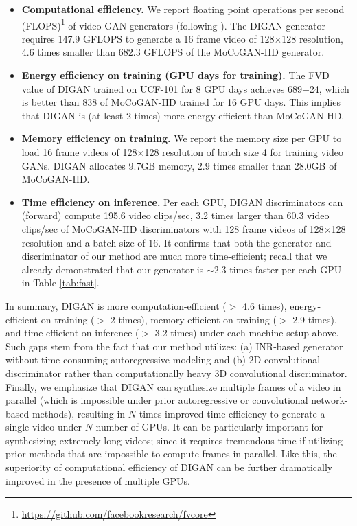 \documentclass{article} \usepackage{iclr2022_conference,times}
\begin{document}
\begin{itemize}[leftmargin=0.2in]
    \item \textbf{Computational efficiency.} 
    We report floating point operations per second (FLOPS)\footnote{\url{ https://github.com/facebookresearch/fvcore}} of video GAN generators (following \citet{liu2021content}). The DIGAN generator requires 147.9 GFLOPS to generate a 16 frame video of 128$\times$128 resolution, 4.6 times smaller than 682.3 GFLOPS of the MoCoGAN-HD generator. 

    \item \textbf{Energy efficiency on training (GPU days for training).} The FVD value of DIGAN trained on UCF-101 for 8 GPU days achieves 689$\pm$24, which is better than 838 of MoCoGAN-HD trained for 16 GPU days. This implies that DIGAN is (at least 2 times) more energy-efficient than MoCoGAN-HD.

    \item \textbf{Memory efficiency on training.} We report the memory size per GPU to load 16 frame videos of 128$\times$128 resolution of batch size 4 for training video GANs. DIGAN allocates 9.7GB memory, 2.9 times smaller than 28.0GB of MoCoGAN-HD.	


    \item \textbf{Time efficiency on inference.} Per each GPU, DIGAN discriminators can (forward) compute 195.6 video clips/sec, 3.2 times larger than 60.3 video clips/sec of MoCoGAN-HD discriminators with 128 frame videos of 128$\times$128 resolution and a batch size of 16. It confirms that both the generator and discriminator of our method are much more time-efficient; recall that we already demonstrated that our generator is $\sim$2.3 times faster per each GPU in Table \ref{tab:fast}.
\end{itemize}
In summary, DIGAN is more computation-efficient ($>$ 4.6 times), energy-efficient on training  ($>$ 2 times), memory-efficient on training ($>$ 2.9 times), and time-efficient on inference ($>$ 3.2 times) under each machine setup above. Such gaps stem from the fact that our method utilizes: (a) INR-based generator without time-consuming autoregressive modeling and (b) 2D convolutional discriminator rather than computationally heavy 3D convolutional discriminator. Finally, we emphasize that DIGAN can synthesize multiple frames of a video in parallel (which is impossible under prior autoregressive or convolutional network-based methods), resulting in $N$ times improved time-efficiency to generate a single video under $N$ number of GPUs. It can be particularly important for synthesizing extremely long videos; since it requires tremendous time if utilizing prior methods that are impossible to compute frames in parallel. Like this, the superiority of computational efficiency of DIGAN can be further dramatically improved in the presence of multiple GPUs.
\end{document}
